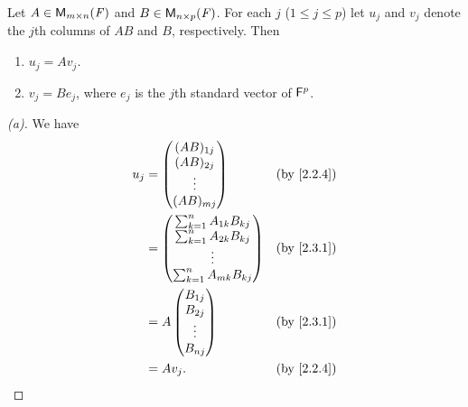 \begin{thm}\label{2.13}
	Let \(A \in \MS\) and \(B \in \ms[n][p][\F]\).
	For each \(j\) (\(1 \leq j \leq p\)) let \(u_j\) and \(v_j\) denote the \(j\)th columns of \(AB\) and \(B\), respectively.
	Then
	\begin{enumerate}
		\item \(u_j = A v_j\).
		\item \(v_j = B e_j\), where \(e_j\) is the \(j\)th standard vector of \(\mathsf{F}^p\).
	\end{enumerate}
\end{thm}

\begin{proof}[(a)]
	We have
	\begin{align*}
		u_j & = \begin{pmatrix}
			        (AB)_{1 j} \\
			        (AB)_{2 j} \\
			        \vdots     \\
			        (AB)_{m j}
		        \end{pmatrix}                 &  & \by{2.2.4}   \\
		    & = \begin{pmatrix}
			        \sum_{k = 1}^n A_{1 k} B_{k j} \\
			        \sum_{k = 1}^n A_{2 k} B_{k j} \\
			        \vdots                         \\
			        \sum_{k = 1}^n A_{m k} B_{k j}
		        \end{pmatrix} &  & \by{2.3.1}                  \\
		    & = A \begin{pmatrix}
			          B_{1 j} \\
			          B_{2 j} \\
			          \vdots  \\
			          B_{n j}
		          \end{pmatrix}               &  & \by{2.3.1}   \\
		    & = A v_j.                          &  & \by{2.2.4}
	\end{align*}
\end{proof}

